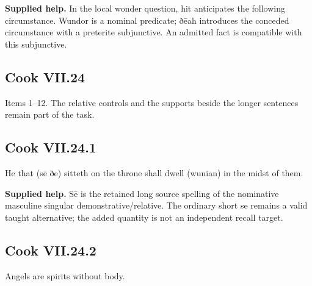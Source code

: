 \textbf{Supplied help.} In the local wonder question, hit anticipates the following circumstance. Wundor is a nominal predicate; ðēah introduces the conceded circumstance with a preterite subjunctive. An admitted fact is compatible with this subjunctive.

\subsection*{Cook VII.24}

Items 1–12. The relative controls and the supports beside the longer sentences remain part of the task.

\par\begin{minipage}{\linewidth}\raggedright
\subsection*{Cook VII.24.1}

He that (sē ðe) sitteth on the throne shall dwell (wunian) in the midst of them.

\end{minipage}\par\addvspace{4pt}

\textbf{Supplied help.} Sē is the retained long source spelling of the nominative masculine singular demonstrative/\allowbreak{}relative. The ordinary short se remains a valid taught alternative; the added quantity is not an independent recall target.

\par\begin{minipage}{\linewidth}\raggedright
\subsection*{Cook VII.24.2}

Angels are spirits without body.

\end{minipage}\par\addvspace{4pt}

